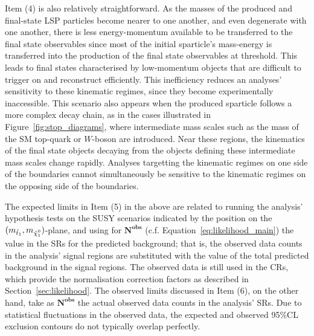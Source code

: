 Item (4) is also relatively straightforward.
As the masses of the produced and final-state LSP particles become nearer to one another, and even
degenerate with one another, there is less energy-momentum available to be transferred to the final state
observables since most of the initial sparticle's mass-energy is transferred into the production of the final
state observables at threshold.
This leads to final states characterised by low-momentum objects that are difficult to trigger on and
reconstruct efficiently.
This inefficiency reduces an analyses' sensitivity to these kinematic regimes, since they become experimentally
inaccessible.
This scenario also appears when the produced sparticle follows a more complex decay chain,
as in the cases illustrated in Figure~\ref{fig:stop_diagrams}, where intermediate mass scales such as the
mass of the SM top-quark or $W$-boson are introduced.
Near these regions, the kinematics of the final state objects decaying from the objects defining these intermediate
mass scales change rapidly.
Analyses targetting the kinematic regimes on one side of the boundaries
cannot simultaneously be sensitive to the kinematic regimes on the opposing side of the boundaries.

The expected limits in Item (5) in the above are related to running the analysis' hypothesis tests
on the SUSY scenarios indicated by the position on the $(m_{\stopone}, m_{\ninoone})$-plane,
and using for $\bm{N^{\text{obs}}}$ (c.f. Equation~\ref{eq:likelihood_main}) the value in the SRs for the predicted background; that is, the
observed data counts in the analysis' signal regions are substituted with the value of the total predicted
background in the signal regions.
The observed data is still used in the CRs, which provide the normalisation correction factors as described in Section~\ref{sec:likelihood}.
The observed limits discussed in Item (6), on the other hand, take as $\bm{N^{\text{obs}}}$ the actual observed data counts
in the analysis' SRs.
Due to statistical fluctuations in the observed data, the expected and observed 95\%CL exclusion contours
do not typically overlap perfectly.

